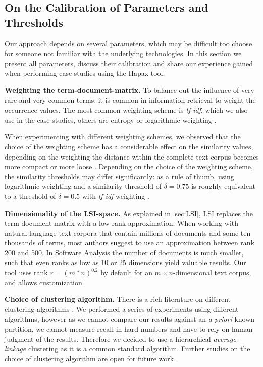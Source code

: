 \subsection{On the Calibration of Parameters and Thresholds}\label{sec:parameters}

Our approach depends on several parameters, which may be difficult too choose for someone not familiar with the underlying technologies. In this section we present all parameters, discuss their calibration and share our experience gained when performing case studies using the Hapax tool.

  \textbf{Weighting the term-document-matrix.} To balance out the influence of very rare and very common terms, it is common in information retrieval to weight the occurrence values. The most common weighting scheme is \emph{tf-idf}, which we also use in the case studies, others are entropy or logarithmic weighting \cite{Duma91a}.

  When experimenting with different weighting schemes, we observed that the choice of the weighting scheme has a considerable effect on the similarity values, depending on the weighting the distance within the complete text corpus becomes more compact or more loose \cite{Nako01b}. Depending on the choice of the weighting scheme, the similarity thresholds may differ significantly: as a rule of thumb, using logarithmic weighting and a similarity threshold of $\delta = 0.75$ is roughly equivalent to a threshold of $\delta = 0.5$ with \emph{tf-idf} weighting \cite{Nako01a}.

  \textbf{Dimensionality of the LSI-space.} As explained in \autoref{sec:LSI}, LSI replaces the term-document matrix with a low-rank approximation. When working with natural language text corpora that contain millions of documents and some ten thousands of terms, most authors suggest to use an approximation between rank 200 and 500. In Software Analysis the number of documents is much smaller, such that even ranks as low as 10 or 25 dimensions yield valuable results. Our tool uses rank $r = (m * n)^{0.2}$ by default for an $m \times n$-dimensional text corpus, and allows customization.

  \textbf{Choice of clustering algorithm.} There is a rich literature on different clustering algorithms \cite{Jain99a}. We performed a series of experiments using different algorithms, however as we cannot compare our results against an \emph{a priori} known partition, we cannot measure recall in hard numbers and have to rely on human judgment of the results. Therefore we decided to use a hierarchical \emph{average-linkage} clustering as it is a common standard algorithm. Further studies on the choice of clustering algorithm are open for future work.

